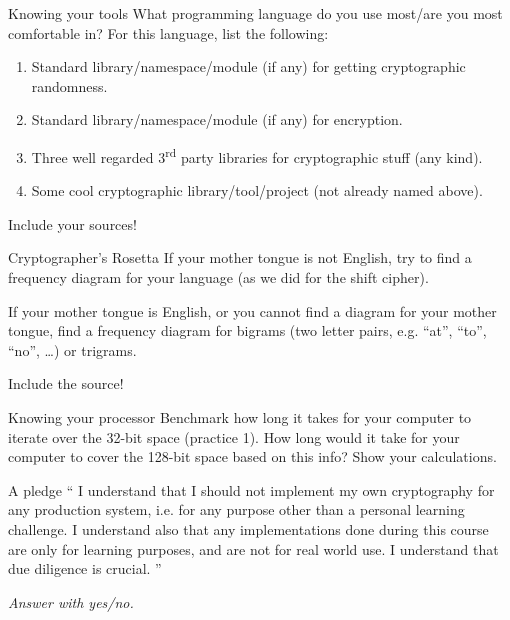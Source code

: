 \documentclass{homework}
\begin{document}
\begin{task}{Knowing your tools}
  What programming language do you use most/are you most comfortable in?
  For this language, list the following:
  \begin{enumerate}
    \item Standard library/namespace/module (if any) for getting cryptographic randomness.
    \item Standard library/namespace/module (if any) for encryption.
    \item Three well regarded 3\textsuperscript{rd} party libraries for cryptographic stuff (any kind).
    \item Some cool cryptographic library/tool/project (not already named above).
  \end{enumerate}

  Include your sources!
\end{task}

\begin{task}{Cryptographer's Rosetta}
  If your mother tongue is not English, try to find a frequency diagram for your language (as we did for the shift cipher).

  If your mother tongue is English, or you cannot find a diagram for your mother tongue, find a frequency diagram for bigrams (two letter pairs, e.g. \enquote{at}, \enquote{to}, \enquote{no}, \dots) or trigrams.

  Include the source!
\end{task}

\begin{task}{Knowing your processor}
  Benchmark how long it takes for your computer to iterate over the 32-bit space (practice 1). How long would it take for your computer to cover the 128-bit space based on this info? Show your calculations.
\end{task}

\begin{task}{A pledge}
  \enquote{%
    I understand that I should not implement my own cryptography for any production system, i.e. for any purpose other than a personal learning challenge.
    I understand also that any implementations done during this course are only for learning purposes, and are not for real world use. I understand that due diligence is crucial.%
  }

  \textit{Answer with yes/no.}
\end{task}

\newpage
\setcounter{task}{0}
\end{document}
